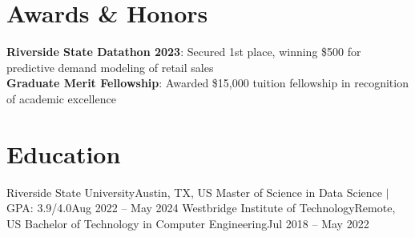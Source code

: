 \section{Awards \& Honors}
 \begin{itemize}[leftmargin=0.15in, label={}]
    \small{\item{
     \textbf{Riverside State Datathon 2023}{: Secured 1st place, winning \$500 for predictive demand modeling of retail sales} \\
     \textbf{Graduate Merit Fellowship}{: Awarded \$15,000 tuition fellowship in recognition of academic excellence}
    }}
 \end{itemize}

\section{Education}
  \resumeSubHeadingListStart
    \resumeSubheading
      {Riverside State University}{Austin, TX, US}
      {Master of Science in Data Science $|$ GPA: 3.9/4.0}{Aug 2022 -- May 2024}
    \resumeSubheading
      {Westbridge Institute of Technology}{Remote, US}
      {Bachelor of Technology in Computer Engineering}{Jul 2018 -- May 2022}
  \resumeSubHeadingListEnd


